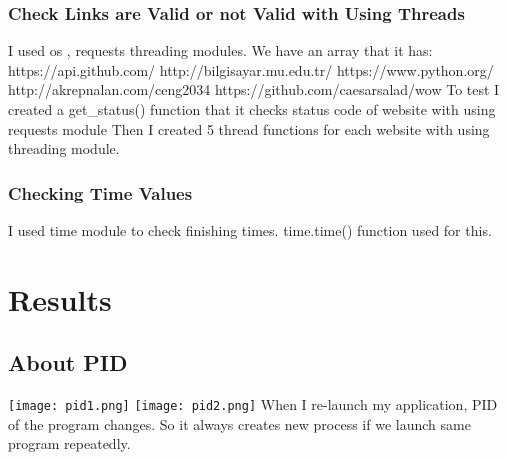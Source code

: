 \documentclass[]{article}
\begin{document}
\subsubsection{Check Links are Valid or not Valid with Using Threads}
I used \boldsymbol os , \boldsymbol requests \boldsymbol threading modules.
We have an array that it has: \newline\newline
https://api.github.com/\newline
http://bilgisayar.mu.edu.tr/\newline
https://www.python.org/\newline
http://akrepnalan.com/ceng2034\newline
https://github.com/caesarsalad/wow\newline\newline
To test I created a \boldsymbol get\_status() function that it checks status code of website with using \boldsymbol requests module\newline\newline
Then I created 5 thread functions for each website with using threading module.\newline
\newline {}\newline
{}\newline
{}

\subsubsection{Checking Time Values}
I used \boldsymbol time module to check finishing times. \boldsymbol time.time() function used for this.


\section{Results}
\subsection{About PID}

\texttt{[image: pid1.png]}
\texttt{[image: pid2.png]}
\newline\newline
When I re-launch my application, PID of the program changes. So it always creates new process if we launch same program repeatedly.
\end{document}
